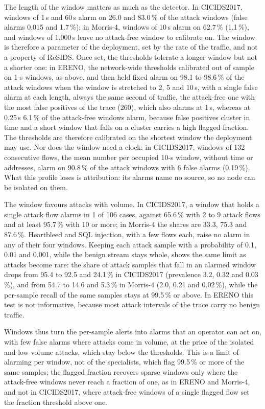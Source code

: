The length of the window matters as much as the detector. In CICIDS2017, windows of 1\,s and 60\,s alarm on 26.0 and 83.0\,\% of the attack windows (false alarms 0.015 and 1.7\,\%); in Morris-4, windows of 10\,s alarm on 62.7\,\% (1.1\,\%), and windows of 1,000\,s leave no attack-free window to calibrate on. The window is therefore a parameter of the deployment, set by the rate of the traffic, and not a property of ReSIDS. Once set, the thresholds tolerate a longer window but not a shorter one: in ERENO, the network-wide thresholds calibrated out of sample on 1-s windows, as above, and then held fixed alarm on 98.1 to 98.6\,\% of the attack windows when the window is stretched to 2, 5 and 10\,s, with a single false alarm at each length, always the same second of traffic, the attack-free one with the most false positives of the trace (260), which also alarms at 1\,s, whereas at 0.25\,s 6.1\,\% of the attack-free windows alarm, because false positives cluster in time and a short window that falls on a cluster carries a high flagged fraction. The thresholds are therefore calibrated on the shortest window the deployment may use. Nor does the window need a clock: in CICIDS2017, windows of 132 consecutive flows, the mean number per occupied 10-s window, without time or addresses, alarm on 90.8\,\% of the attack windows with 6 false alarms (0.19\,\%). What this profile loses is attribution: its alarms name no source, so no node can be isolated on them.

The window favours attacks with volume. In CICIDS2017, a window that holds a single attack flow alarms in 1 of 106 cases, against 65.6\,\% with 2 to 9 attack flows and at least 95.7\,\% with 10 or more; in Morris-4 the shares are 33.3, 75.3 and 87.6\,\%. Heartbleed and SQL injection, with a few flows each, raise no alarm in any of their four windows. Keeping each attack sample with a probability of 0.1, 0.01 and 0.001, while the benign stream stays whole, shows the same limit as attacks become rare: the share of attack samples that fall in an alarmed window drops from 95.4 to 92.5 and 24.1\,\% in CICIDS2017 (prevalence 3.2, 0.32 and 0.03\,\%), and from 54.7 to 14.6 and 5.3\,\% in Morris-4 (2.0, 0.21 and 0.02\,\%), while the per-sample recall of the same samples stays at 99.5\,\% or above. In ERENO this test is not informative, because most attack intervals of the trace carry no benign traffic.

Windows thus turn the per-sample alerts into alarms that an operator can act on, with few false alarms where attacks come in volume, at the price of the isolated and low-volume attacks, which stay below the thresholds. This is a limit of alarming per window, not of the specialists, which flag 99.5\,\% or more of the same samples; the flagged fraction recovers sparse windows only where the attack-free windows never reach a fraction of one, as in ERENO and Morris-4, and not in CICIDS2017, where attack-free windows of a single flagged flow set the fraction threshold above one.

